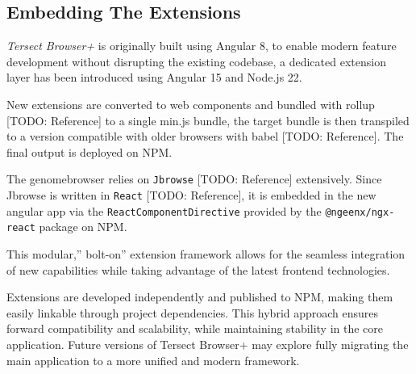 \documentclass[12pt]{article}
\begin{document}
\subsection{Embedding The Extensions }



\textit{Tersect Browser+} is originally built using Angular 8, to enable modern feature development without disrupting the existing codebase, a dedicated extension layer has been introduced using Angular 15 and Node.js 22.  

New extensions are converted to web components and bundled with rollup [TODO: Reference] to a single min.js bundle, the target bundle is then transpiled to a version compatible with older browsers with babel [TODO: Reference]. The final output is deployed on NPM.

The genomebrowser relies on \texttt{Jbrowse} [TODO: Reference] extensively. Since Jbrowse is written in \texttt{React} [TODO: Reference], it is embedded in the new angular app via the \texttt{ReactComponentDirective} provided by the \texttt{@ngeenx/ngx-react} package on NPM. 

This modular,” bolt-on” extension framework allows for the seamless integration of new capabilities while taking advantage of the latest frontend technologies.

Extensions are developed independently and published to NPM, making them easily linkable through project dependencies. This hybrid approach ensures forward compatibility and scalability, while maintaining stability in the core application. Future versions of Tersect Browser+ may explore fully migrating the main application to a more unified and modern framework.
\end{document}
